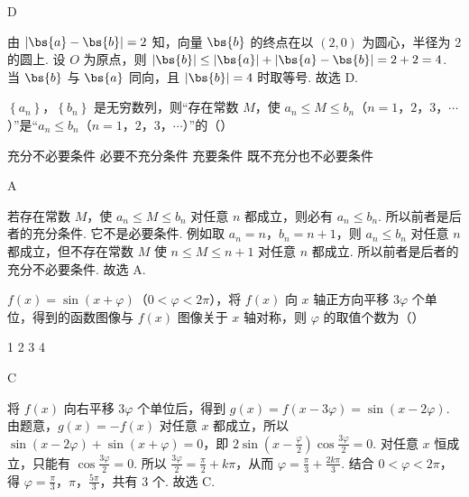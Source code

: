 \documentclass[UTF8,a4paper,oneside,11pt]{ctexbook}
\begin{document}
\begin{answer}
D
\end{answer}

\begin{solution}
由 \( \left| \bs{a}-\bs{b} \right|=2 \) 知，向量 \( \bs{b} \) 的终点在以 \( \left( 2,0 \right) \) 为圆心，半径为 2 的圆上. 设 \(O\) 为原点，则 \( \left| \bs{b} \right|\le \left| \bs{a} \right|+\left| \bs{a}-\bs{b} \right|=2+2=4 \). 当 \( \bs{b} \) 与 \( \bs{a} \) 同向，且 \( \left| \bs{b} \right|=4 \) 时取等号. 故选 D.
\end{solution}

\begin{problem}
\( \left\{ a_n \right\} \)，\( \left\{ b_n \right\} \) 是无穷数列，则“存在常数 \(M\)，使 \( a_n\le M\le b_n \)（\(n=1\)，\(2\)，\(3\)，\(\cdots\)）”是“\( a_n\le b_n \)（\(n=1\)，\(2\)，\(3\)，\(\cdots\)）”的（\quad）

\choices
    {充分不必要条件}
    {必要不充分条件}
    {充要条件}
    {既不充分也不必要条件}
\end{problem}

\begin{answer}
A
\end{answer}

\begin{solution}
若存在常数 \(M\)，使 \( a_n\le M\le b_n \) 对任意 \( n \) 都成立，则必有 \( a_n\le b_n \). 所以前者是后者的充分条件.
它不是必要条件. 例如取 \( a_n=n \)，\( b_n=n+1 \)，则 \( a_n\le b_n \) 对任意 \( n \) 都成立，但不存在常数 \(M\) 使 \( n\le M\le n+1 \) 对任意 \( n \) 都成立.
所以前者是后者的充分不必要条件. 故选 A.
\end{solution}

\begin{problem}
\( f(x)=\sin\left( x+\varphi \right) \)（\( 0<\varphi<2\pi \)），将 \( f(x) \) 向 \( x \) 轴正方向平移 \( 3\varphi \) 个单位，得到的函数图像与 \( f(x) \) 图像关于 \( x \) 轴对称，则 \( \varphi \) 的取值个数为（\quad）

\choices
    {1}
    {2}
    {3}
    {4}
\end{problem}

\begin{answer}
C
\end{answer}

\begin{solution}
将 \( f(x) \) 向右平移 \( 3\varphi \) 个单位后，得到 \( g(x)=f\left( x-3\varphi \right)=\sin\left( x-2\varphi \right) \).
由题意，\( g(x)=-f(x) \) 对任意 \( x \) 都成立，所以 \( \sin\left( x-2\varphi \right)+\sin\left( x+\varphi \right)=0 \)，即 \( 2\sin\left( x-\frac{\varphi}{2} \right)\cos\frac{3\varphi}{2}=0 \).
对任意 \( x \) 恒成立，只能有 \( \cos\frac{3\varphi}{2}=0 \). 所以 \( \frac{3\varphi}{2}=\frac{\pi}{2}+k\pi \)，从而 \( \varphi=\frac{\pi}{3}+\frac{2k\pi}{3} \).
结合 \( 0<\varphi<2\pi \)，得 \(\varphi=\frac{\pi}{3}\)，\(\pi\)，\(\frac{5\pi}{3}\)，共有 3 个. 故选 C.
\end{solution}
\end{document}
